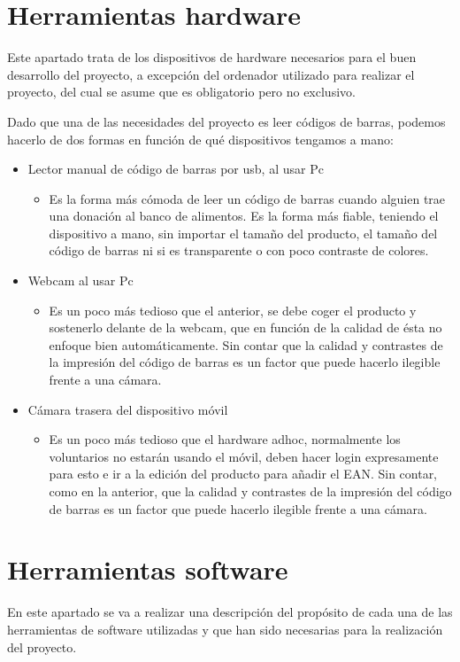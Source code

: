 \section{Herramientas hardware}
Este apartado trata de los dispositivos de hardware necesarios para el buen desarrollo del proyecto, a excepción del ordenador utilizado para realizar el proyecto, del cual se asume que es obligatorio pero no exclusivo.
\vspace{1em}
\par Dado que una de las necesidades del proyecto es leer códigos de barras, podemos hacerlo de dos formas en función de qué dispositivos tengamos a mano:
\begin{itemize}
    \item Lector manual de código de barras por usb, al usar Pc
    \begin{itemize}
        \item Es la forma más cómoda de leer un código de barras cuando alguien trae una donación al banco de alimentos. Es la forma más fiable, teniendo el dispositivo a mano, sin importar el tamaño del producto, el tamaño del código de barras ni si es transparente o con poco contraste de colores.
    \end{itemize}
    \item Webcam al usar Pc
    \begin{itemize}
        \item Es un poco más tedioso que el anterior, se debe coger el producto y sostenerlo delante de la webcam, que en función de la calidad de ésta no enfoque bien automáticamente. Sin contar que la calidad y contrastes de la impresión del código de barras es un factor que puede hacerlo ilegible frente a una cámara.
    \end{itemize}
    \item Cámara trasera del dispositivo móvil
    \begin{itemize}
        \item Es un poco más tedioso que el hardware adhoc, normalmente los voluntarios no estarán usando el móvil, deben hacer login expresamente para esto e ir a la edición del producto para añadir el EAN. Sin contar, como en la anterior, que la calidad y contrastes de la impresión del código de barras es un factor que puede hacerlo ilegible frente a una cámara.
    \end{itemize}
\end{itemize}
\section{Herramientas software}
En este apartado se va a realizar una descripción del propósito de cada una de las herramientas de software utilizadas y que han sido necesarias para la realización del proyecto.
